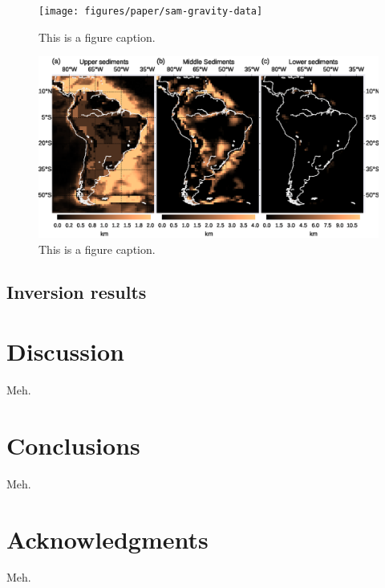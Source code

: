 \documentclass[extra,mreferee]{gji}
\begin{document}
\begin{figure}
    \centering
    \texttt{[image: figures/paper/sam-gravity-data]}
    \caption{This is a figure caption.}
    \label{fig:sam-data}
\end{figure}

\begin{figure}
    \centering
    \includegraphics[width=\textwidth]{figures/paper/sam-gravity-sed}
    \caption{This is a figure caption.}
    \label{fig:sam-sed}
\end{figure}


\subsection{Inversion results}

\section{Discussion}

Meh.

\section{Conclusions}

Meh.

\section{Acknowledgments}

Meh.



\end{document}
